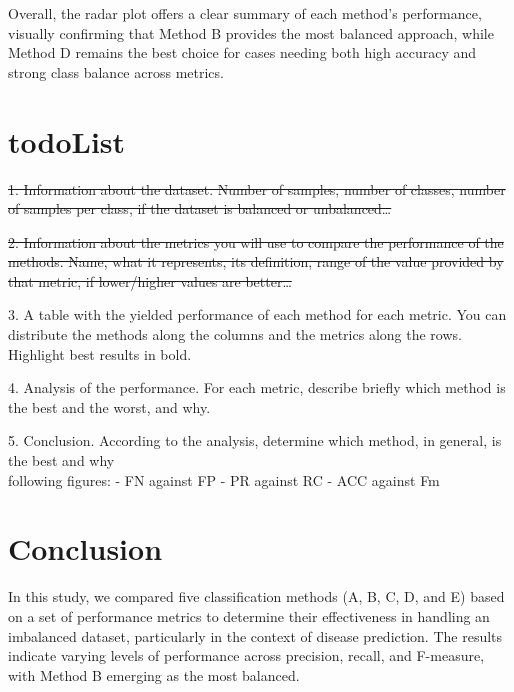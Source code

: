 \documentclass{article}
\begin{document}
Overall, the radar plot offers a clear summary of each method’s performance, visually confirming that Method B provides the most balanced approach, while Method D remains the best choice for cases needing both high accuracy and strong class balance across metrics.
\\


\section{todoList}
\sout{1. Information about the dataset. Number of samples, number of classes, 
number of samples per class, if the dataset is balanced or unbalanced…}


\sout{2. Information about the metrics you will use to compare the performance 
	of the methods. Name, what it represents, its definition, range of the 
	value provided by that metric, if lower/higher values are better…}


3. A table with the yielded performance of each method for each metric. 
You can distribute the methods along the columns and the metrics along 
the rows. Highlight best results in bold.


4. Analysis of the performance. For each metric, describe briefly which 
method is the best and the worst, and why.


5. Conclusion. According to the analysis, determine which method, in general, is the best and why\\





following figures: 
- FN against FP
- PR against RC
- ACC against Fm 
\\

\section{Conclusion}
In this study, we compared five classification methods (A, B, C, D, and E) based on a set of performance metrics to determine their effectiveness in handling an imbalanced dataset, particularly in the context of disease prediction. The results indicate varying levels of performance across precision, recall, and F-measure, with Method B emerging as the most balanced.
\end{document}
